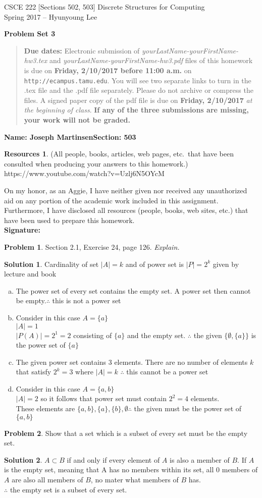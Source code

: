 \documentclass{article}
\theoremstyle{definition}
\newtheorem{problem}{Problem}
\newtheorem*{solution}{Solution}
\newtheorem*{resources}{Resources}
\newcommand{\name}[2]{\noindent\textbf{Name: #1}\hfill \textbf{Section: #2}}
\newcommand{\honor}{\noindent On my honor, as an Aggie, I have neither
  given nor received any unauthorized aid on any portion of the
  academic work included in this assignment. Furthermore, I have
  disclosed all resources (people, books, web sites, etc.) that have
  been used to prepare this homework. \\[2ex]
 \textbf{Signature:} \underline{\hspace*{10cm}} }
\newcommand{\problemset}[1]{\begin{center}\textbf{Problem Set #1}\end{center}}
\newcommand{\duedate}[2]{\begin{quote}\textbf{Due dates:} Electronic
    submission of \textsl{yourLastName-yourFirstName-hw3.tex} and 
    \textsl{yourLastName-yourFirstName-hw3.pdf} files of this homework is due on
    \textbf{#1} on \texttt{http://ecampus.tamu.edu}. You will see two separate links
    to turn in the .tex file and the .pdf file separately. Please do not archive or compress the files.  
    A signed paper copy of the pdf file is due on \textbf{#2} \textsl{at the beginning of class}.
    \textbf{If any of the three submissions are missing, your work will not be graded.}\end{quote} }
\begin{document}
\vspace*{-15mm}
\begin{center}
{\large
CSCE 222 [Sections 502, 503] Discrete Structures for Computing\\[.5ex]
Spring 2017 -- Hyunyoung Lee\\}
\end{center}
\problemset{3}
\duedate{Friday, 2/10/2017 before 11:00 a.m.}{Friday, 2/10/2017}
\name{Joseph Martinsen}{503}
\begin{resources} (All people, books, articles, web pages, etc.\ that
  have been consulted when producing your answers to this homework.)
  https://www.youtube.com/watch?v=Uzlj6N5OYcM
\end{resources}
\honor

\smallskip

\begin{problem} Section 2.1, Exercise 24, page 126. \textsl{Explain.}
\end{problem}
\begin{solution} Cardinality of set $|A| = k$ and of power set is $|P| = 2^k$ given by lecture and book
\begin{enumerate}[a)]
  \item The power set of every set contains the empty set. A power set then cannot be empty.$\therefore$ this is not a power set
  
  \item Consider in this case $A = \{a\}$\\
  $|A| = 1$\\
  $|P(A)| = 2^1 = 2$ consisting of $\{a\}$ and the empty set. $\therefore$ the given $\{\emptyset, \{a\}\}$ is the power set of $\{a\}$
  
  \item The given power set contains 3 elements. There are no number of elements $k$ that satisfy $2^k = 3$ where $|A| = k$ $\therefore$ this cannot be a power set
  
  \item Consider in this case $A = \{a,b\}$ \\
  $|A| = 2$ so it follows that power set must contain $2^2 = 4$ elements. \\
  These elements are $\{a,b\}, \{a\}, \{b\}, \emptyset \therefore$ the given must be the power set of $\{a,b\}$
\end{enumerate}
\end{solution}

\begin{problem} Show that a set which is a subset of every set must be the empty set.
\end{problem}
\begin{solution}
$A \subset B$ if and only if every element of $A$ is also a member of $B$. If $A$ is the empty set, meaning that A has no members within its set, all 0 members of $A$ are also all members of $B$, no mater what members of $B$ has. \\$\therefore$ the empty set is a subset of every set.
\end{solution}
\end{document}
